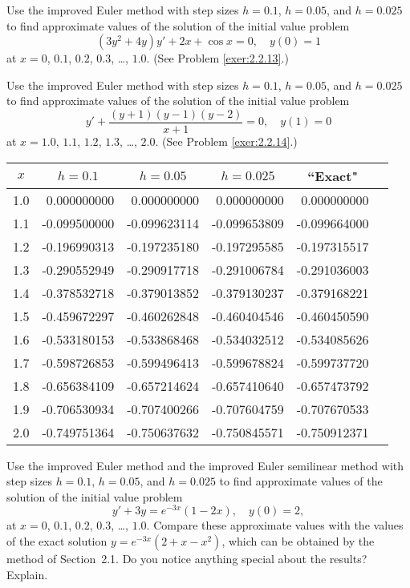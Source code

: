 \documentclass{ximera}
\begin{document}
\begin{problem}\label{exer:3.2.11}
Use the improved Euler method with step sizes $h=0.1$, $h=0.05$, and
$h=0.025$ to find approximate values of the solution of the initial
value problem
$$
(3y^2+4y)y'+2x+\cos x=0, \quad y(0)=1
$$
at $x=0$, $0.1$, $0.2$, $0.3$, \dots, $1.0$. (See Problem \ref{exer:2.2.13}.)
\end{problem}

\begin{problem}\label{exer:3.2.12} 
Use the improved Euler method with step sizes $h=0.1$, $h=0.05$, and
$h=0.025$ to find approximate values of the solution of the initial
value problem
$$
y'+\frac{(y+1)(y-1)(y-2)}{x+1}=0, \quad y(1)=0
$$
at $x=1.0$, $1.1$, $1.2$, $1.3$, \dots, $2.0$. (See Problem \ref{exer:2.2.14}.)

\begin{solution}
    {\small
\begin{tabular}{|c|r|r|r|r|r|}
\hline
\multicolumn{1}{|c|}{$x$}&
\multicolumn{1}{|c|}{$h=0.1$}&
\multicolumn{1}{|c|}{$h=0.05$}&
\multicolumn{1}{|c|}{$h=0.025$}&
\multicolumn{1}{|c|}{``Exact"}\\ \hline
1.0 &  0.000000000 &  0.000000000 &  0.000000000 &  0.000000000 \\
1.1 & -0.099500000 & -0.099623114 & -0.099653809 & -0.099664000 \\
1.2 & -0.196990313 & -0.197235180 & -0.197295585 & -0.197315517 \\
1.3 & -0.290552949 & -0.290917718 & -0.291006784 & -0.291036003 \\
1.4 & -0.378532718 & -0.379013852 & -0.379130237 & -0.379168221 \\
1.5 & -0.459672297 & -0.460262848 & -0.460404546 & -0.460450590 \\
1.6 & -0.533180153 & -0.533868468 & -0.534032512 & -0.534085626 \\
1.7 & -0.598726853 & -0.599496413 & -0.599678824 & -0.599737720 \\
1.8 & -0.656384109 & -0.657214624 & -0.657410640 & -0.657473792 \\
1.9 & -0.706530934 & -0.707400266 & -0.707604759 & -0.707670533 \\
2.0 & -0.749751364 & -0.750637632 & -0.750845571 & -0.750912371 \\
\hline
\end{tabular}}
\end{solution}
\end{problem}

\begin{problem}\label{exer:3.2.13} 
Use the improved Euler method and the improved Euler semilinear method
with step sizes $h=0.1$, $h=0.05$, and $h=0.025$ to find approximate
values of the solution of the initial value problem
$$
y'+3y=e^{-3x}(1-2x),\quad y(0)=2,
$$
at $x=0$, $0.1$, $0.2$, $0.3$, \dots, $1.0$. Compare these approximate
values with the
values of the exact solution $y=e^{-3x}(2+x-x^2)$, which can be
obtained by the method of Section~2.1. Do you notice
anything special about the results? Explain.
\end{problem}
\end{document}
